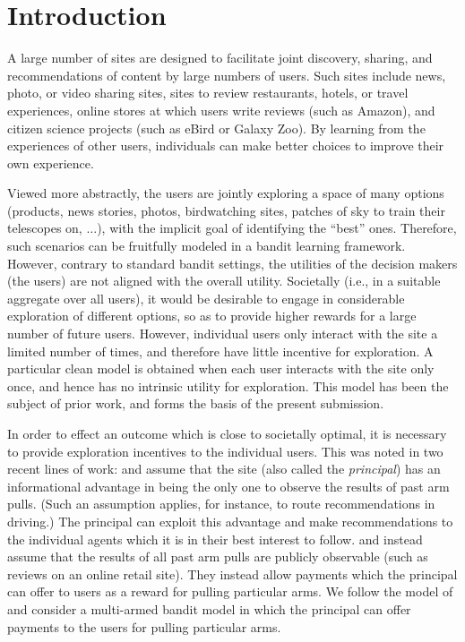 \section{Introduction}

A large number of sites are designed to facilitate joint discovery,
sharing, and recommendations of content by large numbers of users.
Such sites include news, photo, or video sharing sites,
sites to review restaurants, hotels, or travel experiences,
online stores at which users write reviews (such as Amazon),
and citizen science projects
(such as eBird \citep{sullivan2009ebird} or Galaxy Zoo).
By learning from the experiences of other users, individuals can make
better choices to improve their own experience.

Viewed more abstractly, the users are jointly exploring a space of
many options (products, news stories, photos, birdwatching sites,
patches of sky to train their telescopes on, $\ldots$),
with the implicit goal of identifying the ``best'' ones.
Therefore, such scenarios can be fruitfully modeled in a bandit
learning framework.
However, contrary to standard bandit settings, the utilities of the
decision makers (the users) are not aligned with the overall utility.
Societally (i.e., in a suitable aggregate over all users),
it would be desirable to engage in considerable exploration of
different options, so as to provide higher rewards for a large number
of future users.
However, individual users only interact with the site a limited number
of times, and therefore have little incentive for exploration.
A particular clean model is obtained when each user interacts with the
site only once, and hence has no intrinsic utility for exploration. 
This model has been the subject of prior work, and forms the basis of
the present submission.

In order to effect an outcome which is close to societally optimal,
it is necessary to provide exploration incentives to the individual users.
This was noted in two recent lines of work:
\citet{kremer2014implementing}
and \citet{mansour2015bayesian,mansour2016bayesian}
assume that the site (also called the \emph{principal}) has an
informational advantage in being the only one to observe the results
of past arm pulls.
(Such an assumption applies, for instance, to route recommendations in
driving.)
The principal can exploit this advantage and make recommendations to
the individual agents which it is in their best interest to follow.
\citet{frazier2014incentivizing} and 
\citet{han2015incentivizing} instead assume that the results of all
past arm pulls are publicly observable
(such as reviews on an online retail site).
They instead allow payments which the principal can offer to users as
a reward for pulling particular arms.
We follow the model of \citet{frazier2014incentivizing,han2015incentivizing}
and consider a multi-armed bandit model in which the principal can
offer payments to the users for pulling particular arms.

